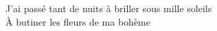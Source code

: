 
\songwordfb{} \songwordfb{} 
J'ai passé tant de nuits à briller sous mille soleils \\
\songwordfb{}
À butiner les fleurs de ma bohème \\
\songwordfb{} \\
